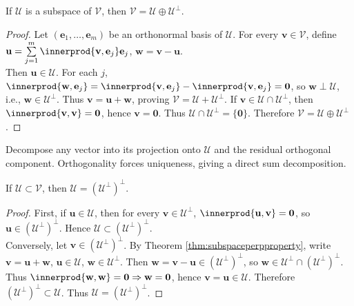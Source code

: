 \begin{theorem} \label{thm:subspaceperpproperty} If $\mathcal{U}$ is a subspace of $\mathcal{V}$, then $\mathcal{V} = \mathcal{U} \oplus \mathcal{U}^{\perp}$.
\begin{proof} Let $(\mathbf{e}_1, \ldots, \mathbf{e}_m)$ be an orthonormal basis of $\mathcal{U}$. For every $\mathbf{v} \in \mathcal{V}$, define $\mathbf{u} = \sum\limits_{j=1}^m \innerprod{\mathbf{v}, \mathbf{e}_j} \mathbf{e}_j$, $\mathbf{w} = \mathbf{v} - \mathbf{u}$.\\
Then $\mathbf{u} \in \mathcal{U}$. For each $j$, $\innerprod{\mathbf{w}, \mathbf{e}_j} = \innerprod{\mathbf{v}, \mathbf{e}_j} - \innerprod{\mathbf{v}, \mathbf{e}_j} = \mathbf{0}$, so $\mathbf{w} \perp \mathcal{U}$, i.e., $\mathbf{w} \in \mathcal{U}^{\perp}$. Thus $\mathbf{v} = \mathbf{u} + \mathbf{w}$, proving $\mathcal{V} = \mathcal{U} + \mathcal{U}^{\perp}$. If $\mathbf{v} \in \mathcal{U} \cap \mathcal{U}^{\perp}$, then $\innerprod{\mathbf{v}, \mathbf{v}} = \mathbf{0}$, hence $\mathbf{v} = \mathbf{0}$. Thus $\mathcal{U} \cap \mathcal{U}^{\perp} = \{ \mathbf{0} \}$. Therefore $\mathcal{V} = \mathcal{U} \oplus \mathcal{U}^{\perp}$.
\end{proof}
\end{theorem}

Decompose any vector into its projection onto $\mathcal{U}$ and the residual orthogonal component. Orthogonality forces uniqueness, giving a direct sum decomposition.

\begin{corollary} If $\mathcal{U} \subset \mathcal{V}$, then $\mathcal{U} = (\mathcal{U}^{\perp})^{\perp}$.
\begin{proof} First, if $\mathbf{u} \in \mathcal{U}$, then for every $\mathbf{v} \in \mathcal{U}^{\perp}$, $\innerprod{\mathbf{u}, \mathbf{v}} = \mathbf{0}$, so $\mathbf{u} \in (\mathcal{U}^{\perp})^{\perp}$. Hence $\mathcal{U} \subset (\mathcal{U}^{\perp})^{\perp}$.\\
Conversely, let $\mathbf{v} \in (\mathcal{U}^{\perp})^{\perp}$. By Theorem \ref{thm:subspaceperpproperty}, write $\mathbf{v} = \mathbf{u} + \mathbf{w}$, $\mathbf{u} \in \mathcal{U}$, $\mathbf{w} \in \mathcal{U}^{\perp}$. Then $\mathbf{w} = \mathbf{v} - \mathbf{u} \in (\mathcal{U}^{\perp})^{\perp}$, so $\mathbf{w} \in \mathcal{U}^{\perp} \cap (\mathcal{U}^{\perp})^{\perp}$. Thus $\innerprod{\mathbf{w}, \mathbf{w}} = \mathbf{0} \Rightarrow \mathbf{w} = \mathbf{0}$, hence $\mathbf{v} = \mathbf{u} \in \mathcal{U}$. Therefore $(\mathcal{U}^{\perp})^{\perp} \subset \mathcal{U}$. Thus $\mathcal{U} = (\mathcal{U}^{\perp})^{\perp}$.
\end{proof}
\end{corollary}

